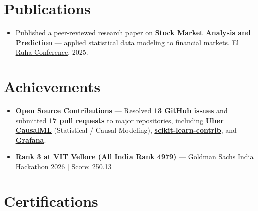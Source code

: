 \documentclass[a4paper,10pt]{article}
\newcommand{\ulink}[2]{\href{#1}{\uline{#2}}}
\begin{document}
\section{Publications}

\begin{itemize}[nosep, leftmargin=1.5em, itemsep=0pt, topsep=0pt]
  \item {\color[HTML]{0A0A0A}\fontsize{11}{14}\selectfont
  Published a \ulink{https://www.elruha.org/_files/ugd/614b1f_6b95e1b697bf452b9907ba46e0151c05.pdf\#page=774}{peer-reviewed research paper} on \ulink{https://github.com/su-jin1425/Set-Project}{\textbf{Stock Market Analysis and Prediction}} --- applied statistical data modeling to financial markets. \ulink{https://www.elruha.org/congress-books}{El Ruha Conference}, 2025.}
\end{itemize}



\section{Achievements}

\begin{itemize}[nosep, leftmargin=1.5em, itemsep=0pt, topsep=0pt]
  \item {\color[HTML]{0A0A0A}\fontsize{11}{14}\selectfont \textbf{\ulink{https://github.com/su-jin1425/My-Open-Source-Contributions}{Open Source Contributions}} --- Resolved \textbf{13 GitHub issues} and submitted \textbf{17 pull requests} to major repositories, including \ulink{https://github.com/uber/causalml}{\textbf{Uber CausalML}} (Statistical / Causal Modeling), \ulink{https://github.com/scikit-learn-contrib/forest-confidence-interval}{\textbf{scikit-learn-contrib}}, and \ulink{https://github.com/grafana/alloy-scenarios}{\textbf{Grafana}}.}
  \item {\color[HTML]{0A0A0A}\fontsize{11}{14}\selectfont \textbf{Rank 3 at VIT Vellore (All India Rank 4979)} --- \ulink{https://www.hackerrank.com/contests/goldman-sachs-india-hackathon-2026-cs/leaderboard}{Goldman Sachs India Hackathon 2026} $|$ Score: 250.13}
\end{itemize}



\section{Certifications}
\end{document}

